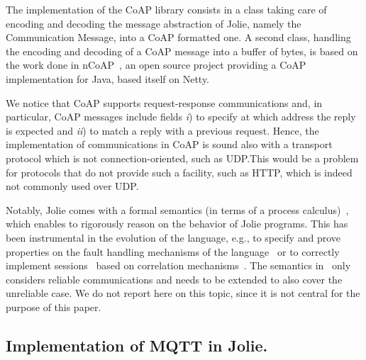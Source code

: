 The implementation of the CoAP library consists in a class taking care of encoding and decoding the message abstraction of Jolie, namely the Communication Message, into a CoAP formatted one. A second class, handling the encoding and decoding of a CoAP message into a buffer of bytes, is based on the work done in nCoAP~\cite{ncoap}, an open source project providing a CoAP implementation for Java, based itself on Netty.

We notice that CoAP supports request-response communications and, in 
particular, CoAP messages include fields \emph{i}) to specify 
at which address the reply is
expected and \emph{ii}) to match a reply with a previous request. Hence, the
implementation of  communications in CoAP is sound also
with a transport protocol which is not connection-oriented, such as UDP.\@ This
would be a problem for protocols that do not provide such a facility, such as
HTTP, which is indeed not commonly used over UDP.

Notably, Jolie comes with a formal semantics (in terms of a process
calculus)~\cite{Guidi2006}, which enables to rigorously reason on the behavior
of Jolie programs. This has been instrumental in the evolution of the language,
e.g., to specify and prove properties on the fault handling mechanisms of the
language~\cite{GuidiLMZ09} or to correctly implement sessions~\cite{MontesiC11}
based on correlation mechanisms~\cite{bpel}. The semantics in~\cite{Guidi2006}
only considers reliable communications and needs to be extended to also cover
the unreliable case. We do not report here on this topic, since it is not
central for the purpose of this paper.

\subsection{Implementation of MQTT in Jolie.} %
\label{sub:impl_mqtt}

